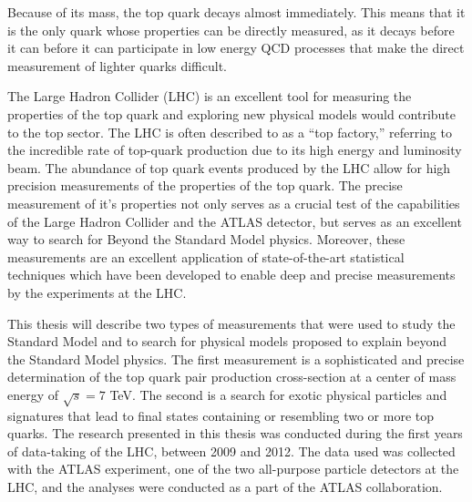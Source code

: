 Because of its mass, the top quark decays almost immediately.
This means that it is the only quark whose properties can be directly measured,
as it decays before it can before it can participate in low energy QCD processes that make the direct measurement of lighter quarks difficult.

The Large Hadron Collider (LHC) is an excellent tool for measuring the properties of the top quark
and exploring new physical models would contribute to the top sector.
The LHC is often described to as a ``top factory,'' referring to the incredible rate of top-quark production due to its high energy and luminosity beam.
The abundance of top quark events produced by the LHC allow for high precision measurements of the properties of the top quark.
The precise measurement of it's properties not only serves as a crucial test of the capabilities of the Large Hadron Collider and the ATLAS detector,
but serves as an excellent way to search for Beyond the Standard Model physics.
Moreover, these measurements are an excellent application of state-of-the-art statistical techniques which have been developed to enable deep and precise measurements by the experiments at the LHC.

This thesis will describe two types of measurements that were used to study the Standard Model and to search for physical models proposed to explain beyond the Standard Model physics.
The first measurement is a sophisticated and precise determination of the top quark pair production cross-section at a center of mass energy of $\sqrt{s} = 7$ TeV.
The second is a search for exotic physical particles and signatures that lead to final states containing or resembling two or more top quarks.
The research presented in this thesis was conducted during the first years of data-taking of the LHC, between 2009 and 2012.
The data used was collected with the ATLAS experiment, one of the two all-purpose particle detectors at the LHC,
and the analyses were conducted as a part of the ATLAS collaboration.



